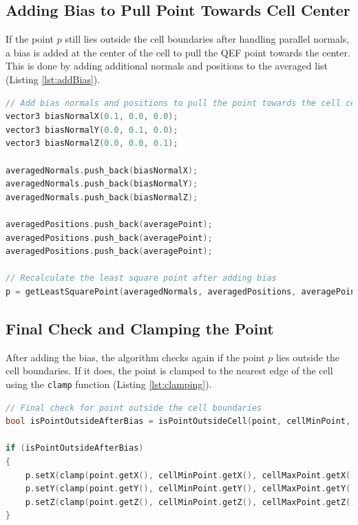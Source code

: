 \subsection{Adding Bias to Pull Point Towards Cell Center}
If the point \( p \) still lies outside the cell boundaries after handling parallel normals, a bias is added at the center of the cell to pull the QEF point towards the center. This is done by adding additional normals and positions to the averaged list (Listing \ref{lst:addBias}).

\vspace{2mm}
\begin{lstlisting}[language=C++, caption=Adding bias to pull point towards cell center, label=lst:addBias]
// Add bias normals and positions to pull the point towards the cell center
vector3 biasNormalX(0.1, 0.0, 0.0);
vector3 biasNormalY(0.0, 0.1, 0.0);
vector3 biasNormalZ(0.0, 0.0, 0.1);

averagedNormals.push_back(biasNormalX);
averagedNormals.push_back(biasNormalY);
averagedNormals.push_back(biasNormalZ);

averagedPositions.push_back(averagePoint);
averagedPositions.push_back(averagePoint);
averagedPositions.push_back(averagePoint);

// Recalculate the least square point after adding bias
p = getLeastSquarePoint(averagedNormals, averagedPositions, averagePoint, alpha);
\end{lstlisting}

\subsection{Final Check and Clamping the Point}

After adding the bias, the algorithm checks again if the point \( p \) lies outside the cell boundaries. If it does, the point is clamped to the nearest edge of the cell using the \texttt{clamp} function (Listing \ref{lst:clamping}).

\vspace{2mm}
\begin{lstlisting}[language=C++, caption=Final check and clamping the point to the nearest boundary, label=lst:clamping]
// Final check for point outside the cell boundaries
bool isPointOutsideAfterBias = isPointOutsideCell(point, cellMinPoint, cellMaxPoint);

if (isPointOutsideAfterBias)
{
    p.setX(clamp(point.getX(), cellMinPoint.getX(), cellMaxPoint.getX()));
    p.setY(clamp(point.getY(), cellMinPoint.getY(), cellMaxPoint.getY()));
    p.setZ(clamp(point.getZ(), cellMinPoint.getZ(), cellMaxPoint.getZ()));
}
\end{lstlisting}


